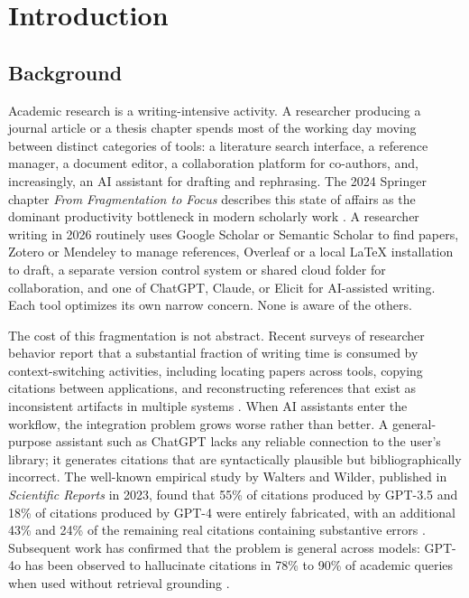 \chapter{Introduction}
\label{ch:introduction}

\section{Background}
\label{sec:background}

Academic research is a writing-intensive activity. A researcher producing a journal article or a thesis chapter spends most of the working day moving between distinct categories of tools: a literature search interface, a reference manager, a document editor, a collaboration platform for co-authors, and, increasingly, an AI assistant for drafting and rephrasing. The 2024 Springer chapter \textit{From Fragmentation to Focus} describes this state of affairs as the dominant productivity bottleneck in modern scholarly work \cite{springer2024fragmentation}. A researcher writing in 2026 routinely uses Google Scholar or Semantic Scholar to find papers, Zotero \cite{zotero2024} or Mendeley \cite{mendeley2024} to manage references, Overleaf \cite{overleaf2024} or a local LaTeX installation to draft, a separate version control system or shared cloud folder for collaboration, and one of ChatGPT, Claude, or Elicit \cite{elicit2024} for AI-assisted writing. Each tool optimizes its own narrow concern. None is aware of the others.

The cost of this fragmentation is not abstract. Recent surveys of researcher behavior report that a substantial fraction of writing time is consumed by context-switching activities, including locating papers across tools, copying citations between applications, and reconstructing references that exist as inconsistent artifacts in multiple systems \cite{springer2024fragmentation, khalifa2024aiwriting}. When AI assistants enter the workflow, the integration problem grows worse rather than better. A general-purpose assistant such as ChatGPT lacks any reliable connection to the user's library; it generates citations that are syntactically plausible but bibliographically incorrect. The well-known empirical study by Walters and Wilder, published in \textit{Scientific Reports} in 2023, found that 55\% of citations produced by GPT-3.5 and 18\% of citations produced by GPT-4 were entirely fabricated, with an additional 43\% and 24\% of the remaining real citations containing substantive errors \cite{walters2023fabrication}. Subsequent work has confirmed that the problem is general across models: GPT-4o has been observed to hallucinate citations in 78\% to 90\% of academic queries when used without retrieval grounding \cite{asai2025openscholar}.

